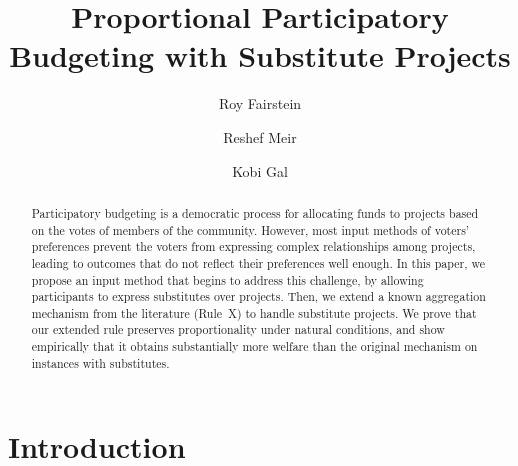 \documentclass[runningheads]{llncs}
\begin{document}
%
\title{Proportional Participatory Budgeting with Substitute Projects}
%
%

\author{Roy Fairstein \and
Reshef Meir \and
Kobi Gal}
%
%
%
\maketitle              %
%
\begin{abstract}
Participatory budgeting is a democratic process for allocating funds to projects based on the votes of members of the community.  However, most input methods of voters' preferences  prevent the voters from expressing 
complex relationships among projects, 
 leading to outcomes that do not reflect their preferences well enough. In this paper, we propose an  input method that begins to address this challenge, by  allowing  participants to express substitutes over projects.  Then, we extend a known aggregation mechanism    from the literature (Rule~X) to handle substitute projects. We  prove that our extended rule preserves proportionality under natural conditions, and show empirically that it obtains  substantially more welfare than the original mechanism on instances with substitutes.

\end{abstract}
%
%
%
\section{Introduction}
\end{document}

